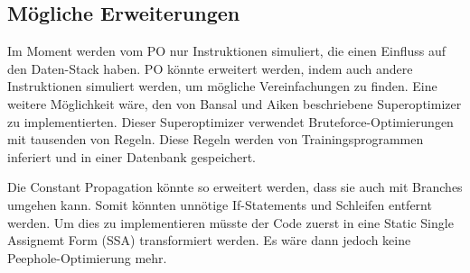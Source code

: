 \subsection{Mögliche Erweiterungen}

Im Moment werden vom PO nur Instruktionen simuliert, die einen Einfluss auf den Daten-Stack haben. PO könnte erweitert werden, indem auch andere Instruktionen simuliert werden, um mögliche Vereinfachungen zu finden. Eine weitere Möglichkeit wäre, den von Bansal und Aiken beschriebene Superoptimizer zu implementierten. Dieser Superoptimizer verwendet Bruteforce-Optimierungen mit tausenden von Regeln. Diese Regeln werden von Trainingsprogrammen inferiert und in einer Datenbank gespeichert.\cite{superoptimizer}

Die Constant Propagation könnte so erweitert werden, dass sie auch mit Branches umgehen kann. Somit könnten unnötige If-Statements und Schleifen entfernt werden. Um dies zu implementieren müsste der Code zuerst in eine Static Single Assignemt Form (SSA) transformiert werden.\cite{ssa} Es wäre dann jedoch keine Peephole-Optimierung mehr.